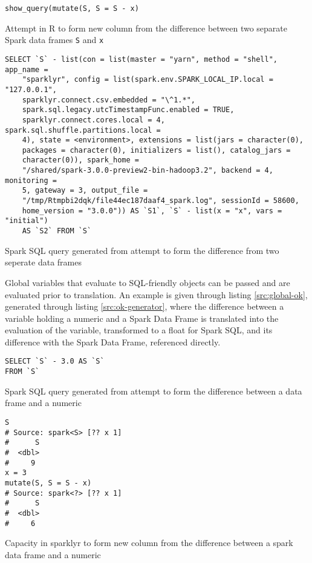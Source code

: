 \documentclass[a4paper,10pt]{article}
\begin{document}
\begin{listing}
\begin{verbatim}
show_query(mutate(S, S = S - x)
\end{verbatim}
\caption{Attempt in R to form new column from the difference between two separate Spark data frames \texttt{S} and \texttt{x}}\label{src:bad}
\end{listing}

\begin{listing}
\begin{verbatim}
SELECT `S` - list(con = list(master = "yarn", method = "shell", app_name =
	"sparklyr", config = list(spark.env.SPARK_LOCAL_IP.local = "127.0.0.1",
	sparklyr.connect.csv.embedded = "\^1.*",
	spark.sql.legacy.utcTimestampFunc.enabled = TRUE,
	sparklyr.connect.cores.local = 4, spark.sql.shuffle.partitions.local =
	4), state = <environment>, extensions = list(jars = character(0),
	packages = character(0), initializers = list(), catalog_jars =
	character(0)), spark_home =
	"/shared/spark-3.0.0-preview2-bin-hadoop3.2", backend = 4, monitoring =
	5, gateway = 3, output_file =
	"/tmp/Rtmpbi2dqk/file44ec187daaf4_spark.log", sessionId = 58600,
	home_version = "3.0.0")) AS `S1`, `S` - list(x = "x", vars = "initial")
	AS `S2` FROM `S`
\end{verbatim}
\caption{Spark SQL query generated from attempt to form the difference from two seperate data frames}\label{src:computer-no}
\end{listing}

Global variables that evaluate to SQL-friendly objects can be passed and are
evaluated prior to translation.
An example is given through listing \ref{src:global-ok}, generated through
listing \ref{src:ok-generator}, where the difference between a variable holding
a numeric and a Spark Data Frame is translated into the evaluation of the
variable, transformed to a float for Spark SQL, and its difference with the
Spark Data Frame, referenced directly.

\begin{listing}
\begin{verbatim}
SELECT `S` - 3.0 AS `S`
FROM `S`
\end{verbatim}
\caption{Spark SQL query generated from attempt to form the difference between a data frame and a numeric}\label{src:global-ok}
\end{listing}

\begin{listing}
\begin{verbatim}
S
# Source: spark<S> [?? x 1]
#      S
#  <dbl>
#     9
x = 3
mutate(S, S = S - x)
# Source: spark<?> [?? x 1]
#      S
#  <dbl>
#     6
\end{verbatim}
\caption{Capacity in sparklyr to form new column from the difference between a spark data frame and a numeric}\label{src:ok-generator}
\end{listing}
\end{document}
